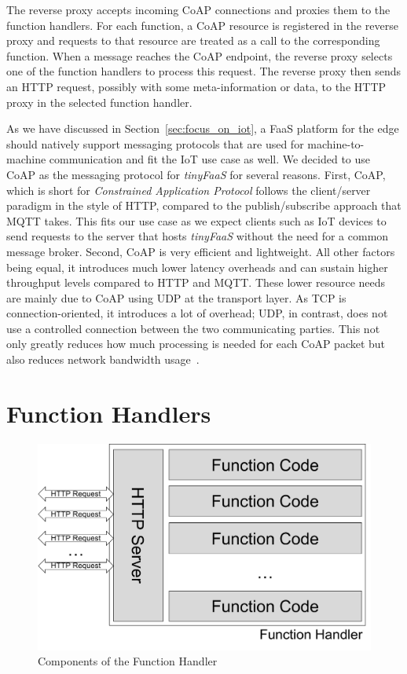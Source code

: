 The reverse proxy accepts incoming CoAP connections and proxies them to the function handlers.
For each function, a CoAP resource is registered in the reverse proxy and requests to that resource are treated as a call to the corresponding function.
When a message reaches the CoAP endpoint, the reverse proxy selects one of the function handlers to process this request.
The reverse proxy then sends an HTTP request, possibly with some meta-information or data, to the HTTP proxy in the selected function handler.

As we have discussed in Section~\ref{sec:focus_on_iot}, a FaaS platform for the edge should natively support messaging protocols that are used for machine-to-machine communication and fit the IoT use case as well.
We decided to use CoAP as the messaging protocol for \textit{tinyFaaS} for several reasons.
First, CoAP, which is short for \textit{Constrained Application Protocol} follows the client/server paradigm in the style of HTTP, compared to the publish/subscribe approach that MQTT takes.
This fits our use case as we expect clients such as IoT devices to send requests to the server that hosts \textit{tinyFaaS} without the need for a common message broker.
Second, CoAP is very efficient and lightweight.
All other factors being equal, it introduces much lower latency overheads and can sustain higher throughput levels compared to HTTP and MQTT.
These lower resource needs are mainly due to CoAP using UDP at the transport layer.
As TCP is connection-oriented, it introduces a lot of overhead; UDP, in contrast, does not use a controlled connection between the two communicating parties.
This not only greatly reduces how much processing is needed for each CoAP packet but also reduces network bandwidth usage~\cite{Laaroussi2018-fk,Naik2017-cn}.


\section{Function Handlers}
\label{sec:handlers}

\begin{figure}
	\centering
	\includegraphics[width=0.66\columnwidth]{fig/functionhandler.pdf}
	\caption{Components of the Function Handler}
	\label{fig:functionhandlers}
\end{figure}

